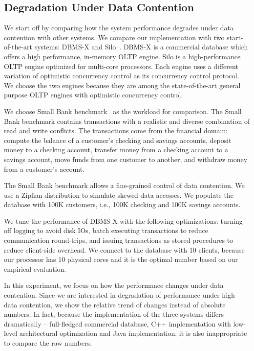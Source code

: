 \subsection{Degradation Under Data Contention}
\label{subsec:experiment:compare}

We start off by comparing how the system performance degrades under data contention with other systems. We compare our implementation with two start-of-the-art systems: DBMS-X and Silo~\cite{tu2013speedy}. DBMS-X is a commercial database which offers a high performance, in-memory OLTP engine. Silo is a high-performance OLTP engine optimized for multi-core processors. Each engine uses a different variation of optimistic concurrency control as its concurrency control protocol. We choose the two engines because they are among the state-of-the-art general purpose OLTP engines with optimistic concurrency control.

We choose Small Bank benchmark~\cite{alomari2008icde} as the workload for comparison. 
The Small Bank benchmark contains transactions with a realistic and diverse
combination of read and write conflicts. The transactions come from the
financial domain: compute the balance of a customer's checking and savings
accounts, deposit money to a checking account, transfer money from a checking
account to a savings account, move funds from one customer to another, and withdraw money from a customer's account.

The Small Bank benchmark allows a fine-grained control of data contention. We use a Zipfian distribution to simulate skewed data accesses. We populate the database with 100K customers, i.e., 100K checking and 100K savings accounts.

We tune the performance of DBMS-X with the following optimizations: turning off logging to avoid disk IOs, batch executing transactions to reduce communication round-trips, and issuing transactions as stored procedures to reduce client-side overhead. We connect to the database with 10 clients, because our processor has 10 physical cores and it is the optimal number based on our empirical evaluation.

In this experiment, we focus on how the performance changes under data contention. Since we are interested in degradation of performance under high data contention, we show the relative trend of changes instead of absolute numbers. In fact, because the implementation of the three systems differs dramatically -- full-fledged commercial database, C++ implementation with low-level architectural optimization and Java implementation, it is also inappropriate to compare the raw numbers.

